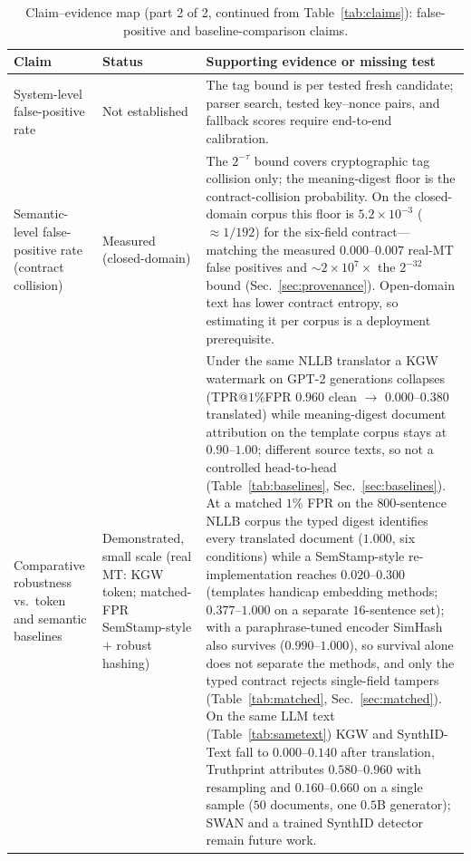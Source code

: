 \documentclass[journal]{IEEEtran}
\begin{document}
\begin{table}[t]
\centering
\small
\caption{Claim--evidence map (part 2 of 2, continued from Table~\ref{tab:claims}):
false-positive and baseline-comparison claims.}
\label{tab:claims2}
\begin{tabularx}{\textwidth}{@{}>{\raggedright\arraybackslash}p{3.1cm}>{\raggedright\arraybackslash}p{3.0cm}X@{}}
\toprule
Claim & Status & Supporting evidence or missing test \\
\midrule
System-level false-positive rate & Not established & The tag bound is per tested fresh candidate; parser search, tested key--nonce pairs, and fallback scores require end-to-end calibration. \\
Semantic-level false-positive rate (contract collision) & Measured (closed-domain) & The $2^{-\tau}$ bound covers cryptographic tag collision only; the meaning-digest floor is the contract-collision probability. On the closed-domain corpus this floor is $5.2\times10^{-3}$ ($\approx1/192$) for the six-field contract---matching the measured $0.000$--$0.007$ real-MT false positives and $\sim\!2\times10^{7}\times$ the $2^{-32}$ bound (Sec.~\ref{sec:provenance}). Open-domain text has lower contract entropy, so estimating it per corpus is a deployment prerequisite. \\
Comparative robustness vs.\ token and semantic baselines & Demonstrated, small scale (real MT: KGW token; matched-FPR SemStamp-style $+$ robust hashing) & Under the same NLLB translator a KGW watermark on GPT-2 generations collapses (TPR@$1\%$FPR $0.960$ clean $\to$ $0.000$--$0.380$ translated) while meaning-digest document attribution on the template corpus stays at $0.90$--$1.00$; different source texts, so not a controlled head-to-head (Table~\ref{tab:baselines}, Sec.~\ref{sec:baselines}). At a matched $1\%$ FPR on the $800$-sentence NLLB corpus the typed digest identifies every translated document ($1.000$, six conditions) while a SemStamp-style re-implementation reaches $0.020$--$0.300$ (templates handicap embedding methods; $0.377$--$1.000$ on a separate $16$-sentence set); with a paraphrase-tuned encoder SimHash also survives ($0.990$--$1.000$), so survival alone does not separate the methods, and only the typed contract rejects single-field tampers (Table~\ref{tab:matched}, Sec.~\ref{sec:matched}). On the same LLM text (Table~\ref{tab:sametext}) KGW and SynthID-Text fall to $0.000$--$0.140$ after translation, Truthprint attributes $0.580$--$0.960$ with resampling and $0.160$--$0.660$ on a single sample ($50$ documents, one $0.5$B generator); SWAN and a trained SynthID detector remain future work. \\

\end{tabularx}
\end{table}
\end{document}
